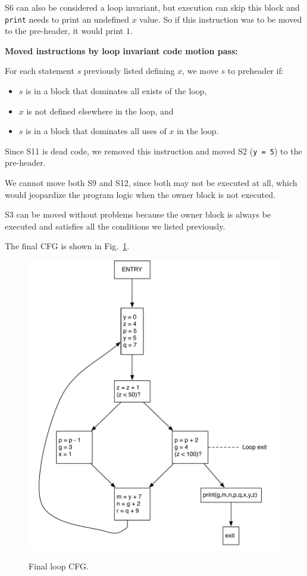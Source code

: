 \documentclass[12pt]{article}
\begin{document}
S6 can also be considered a loop invariant, but execution can skip this block and \texttt{print} needs to print an undefined $x$ value. So if this instruction was to be moved to the pre-header, it would print $1$.

\textbf{Moved instructions by loop invariant code motion pass:}

For each statement $s$ previously listed defining $x$, we move $s$ to preheader if:

\begin{itemize}
   \item $s$ is in a block that dominates all exists of the loop,
   \item $x$ is not defined elsewhere in the loop, and
   \item $s$ is in a block that dominates all uses of $x$ in the loop.
\end{itemize}

Since S11 is dead code, we removed this instruction and moved S2 (\texttt{y = 5}) to the pre-header.

We cannot move both S9 and S12, since both may not be executed at all, which would jeopardize the program logic when the owner block is not executed.

S3 can be moved without problems because the owner block is always be executed and satisfies all the conditions we listed previously.

The final CFG is shown in Fig.~\ref{fig:loop}.


\begin{figure}[h]
    \centering
    \caption{Final loop CFG.}
    \includegraphics[scale=0.75]{loop.pdf}
    \label{fig:loop}
\end{figure}
\end{document}
